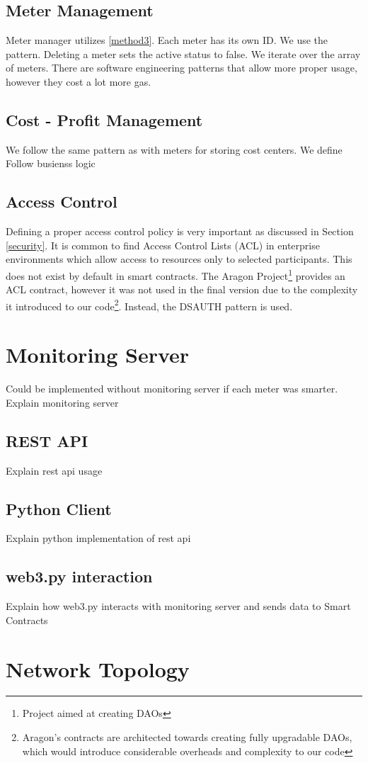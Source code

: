 \subsection{Meter Management}
Meter manager utilizes \ref{method3}. Each meter has its own ID. We use the pattern. Deleting a meter sets the active status to false. We iterate over the array of meters. There are software engineering patterns \cite{crud} that allow more proper usage, however they cost a lot more gas. 

\subsection{Cost - Profit Management}
We follow the same pattern as with meters for storing cost centers. We define 
Follow busienss logic

\subsection{Access Control}
Defining a proper access control policy is very important as discussed in Section \ref{security}. It is common to find Access Control Lists (ACL) in enterprise environments which allow access to resources only to selected participants. This does not exist by default in smart contracts. The Aragon Project\footnote{Project aimed at creating DAOs} provides an ACL contract, however it was not used in the final version due to the complexity it introduced to our code\footnote{Aragon's contracts are architected towards creating fully upgradable DAOs, which would introduce considerable overheads and complexity to our code}. Instead, the DSAUTH pattern is used.

\section{Monitoring Server}
Could be implemented without monitoring server if each meter was smarter. 
Explain monitoring server

\subsection{REST API} 
Explain rest api usage 

\subsection{Python Client}
Explain python implementation of rest api

\subsection{web3.py interaction}
Explain how web3.py interacts with monitoring server and sends data to Smart Contracts

\section{Network Topology}
